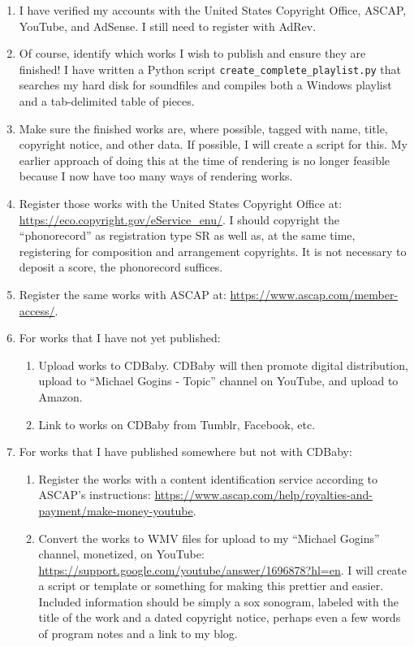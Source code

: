 \documentclass[english,11pt,letterpaper,onecolumn]{scrartcl}
\begin{document}
\begin{enumerate}
\item I have verified my accounts with the United States Copyright Office, ASCAP, YouTube, and AdSense. I still need to register with AdRev.
\item Of course, identify which works I wish to publish and ensure they are finished! I have written a Python script \texttt{create\_complete\_playlist.py} that searches my hard disk for soundfiles and compiles both a Windows playlist and a tab-delimited table of pieces.
\item Make sure the finished works are, where possible, tagged with name, title, copyright notice, and other data. If possible, I will create a script for this. My earlier approach of doing this at the time of rendering is no longer feasible because I now have too many ways of rendering works.
\item Register those works with the United States Copyright Office at: \url{https://eco.copyright.gov/eService_enu/}. I should copyright  the ``phonorecord'' as registration type SR as well as, at the same time, registering for composition and arrangement copyrights. It is not necessary to deposit a score, the phonorecord suffices.
\item Register the same works with ASCAP at: \url{https://www.ascap.com/member-access/}. 
\item For works that I have not yet published:
\begin{enumerate}
	\item Upload works to CDBaby. CDBaby will then promote digital distribution, upload to ``Michael Gogins - Topic'' channel on YouTube, and upload to Amazon.
	\item Link to works on CDBaby from Tumblr, Facebook, etc.
\end{enumerate}
\item For works that I have published somewhere but not with CDBaby:
\begin{enumerate}
	\item Register the works with a content identification service according to ASCAP's instructions: \url{https://www.ascap.com/help/royalties-and-payment/make-money-youtube}. 
	\item Convert the works to WMV files for upload to my ``Michael Gogins'' channel, monetized, on YouTube: \url{https://support.google.com/youtube/answer/1696878?hl=en}. I will create a script or template or something for making this prettier and easier. Included information should be simply a sox sonogram, labeled with the title of the work and a dated copyright notice, perhaps even a few words of program notes and a link to my blog.
\end{enumerate}
\end{enumerate}
\end{document}
